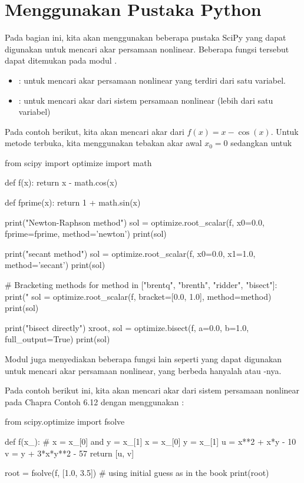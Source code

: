 \section{Menggunakan Pustaka Python}

Pada bagian ini, kita akan menggunakan beberapa pustaka SciPy yang dapat digunakan
untuk mencari akar persamaan nonlinear. Beberapa fungsi tersebut dapat ditemukan
pada modul .
\begin{itemize}
\item {}: untuk mencari akar persamaan nonlinear
yang terdiri dari satu variabel.
\item {}: untuk mencari akar dari sistem persamaan
nonlinear (lebih dari satu variabel)
\end{itemize}

Pada contoh berikut, kita akan mencari akar dari $f(x) = x - \cos(x)$.
Untuk metode terbuka, kita menggunakan tebakan akar awal $x_0 = 0$
sedangkan untuk 
\begin{pythoncode}
from scipy import optimize
import math
    
def f(x):
    return x - math.cos(x)
    
def fprime(x):
    return 1 + math.sin(x)
    
print("\nUsing Newton-Raphson method")
sol = optimize.root_scalar(f, x0=0.0, fprime=fprime, method='newton')
print(sol)
    
print("\nUsing secant method")
sol = optimize.root_scalar(f, x0=0.0, x1=1.0, method='secant')
print(sol)
    
# Bracketing methods
for method in ["brentq", "brenth", "ridder", "bisect"]:
    print("\nUsing %
    sol = optimize.root_scalar(f, bracket=[0.0, 1.0], method=method)
    print(sol)

print("\nUsing bisect directly")
xroot, sol = optimize.bisect(f, a=0.0, b=1.0, full_output=True)
print(sol)    
\end{pythoncode}
Modul  juga menyediakan beberapa fungsi lain seperti
 yang dapat digunakan untuk mencari akar persamaan
nonlinear, yang berbeda hanyalah  atau -nya.

Pada contoh berikut ini, kita akan mencari akar dari sistem persamaan nonlinear
pada Chapra Contoh 6.12 dengan menggunakan :
\begin{pythoncode}
from scipy.optimize import fsolve

def f(x_):
    # x = x_[0] and y = x_[1] 
    x = x_[0]
    y = x_[1]
    u = x**2 + x*y - 10
    v = y + 3*x*y**2 - 57
    return [u, v]
    
root = fsolve(f, [1.0, 3.5]) # using initial guess as in the book
print(root)
\end{pythoncode}

